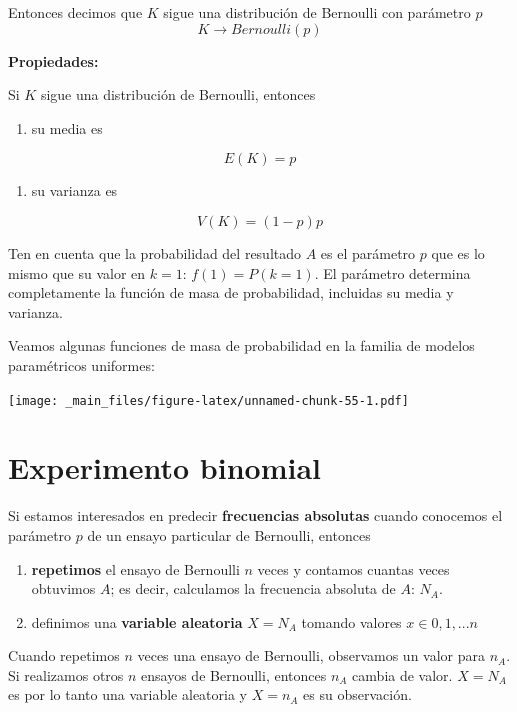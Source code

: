 \documentclass[
]{book}
\providecommand{\tightlist}{%
  \setlength{\itemsep}{0pt}\setlength{\parskip}{0pt}}
\begin{document}
Entonces decimos que \(K\) sigue una distribución de Bernoulli con parámetro \(p\)
\[K \rightarrow Bernoulli(p)\]

\textbf{Propiedades:}

Si \(K\) sigue una distribución de Bernoulli, entonces

\begin{enumerate}
\def\labelenumi{\arabic{enumi})}
\tightlist
\item
  su media es
\end{enumerate}

\[E(K)=p\]

\begin{enumerate}
\def\labelenumi{\arabic{enumi})}
\setcounter{enumi}{1}
\tightlist
\item
  su varianza es
\end{enumerate}

\[V(K)=(1-p)p\]

Ten en cuenta que la probabilidad del resultado \(A\) es el parámetro \(p\)
que es lo mismo que su valor en \(k=1\): \(f(1)=P(k=1)\). El parámetro determina completamente la función de masa de probabilidad, incluidas su media y varianza.

Veamos algunas funciones de masa de probabilidad en la familia de modelos paramétricos uniformes:

\texttt{[image: \_main\_files/figure-latex/unnamed-chunk-55-1.pdf]}

\hypertarget{experimento-binomial}{%
\section{Experimento binomial}\label{experimento-binomial}}

Si estamos interesados en predecir \textbf{frecuencias absolutas} cuando conocemos el parámetro \(p\) de un ensayo particular de Bernoulli, entonces

\begin{enumerate}
\def\labelenumi{\arabic{enumi})}
\item
  \textbf{repetimos} el ensayo de Bernoulli \(n\) veces y contamos cuantas veces obtuvimos \(A\); es decir, calculamos la frecuencia absoluta de \(A\): \(N_A\).
\item
  definimos una \textbf{variable aleatoria} \(X=N_A\) tomando valores \(x \in {0,1,...n}\)
\end{enumerate}

Cuando repetimos \(n\) veces una ensayo de Bernoulli, observamos un valor para \(n_A\). Si realizamos otros \(n\) ensayos de Bernoulli, entonces \(n_A\) cambia de valor. \(X=N_A\) es por lo tanto una variable aleatoria y \(X=n_A\) es su observación.
\end{document}
